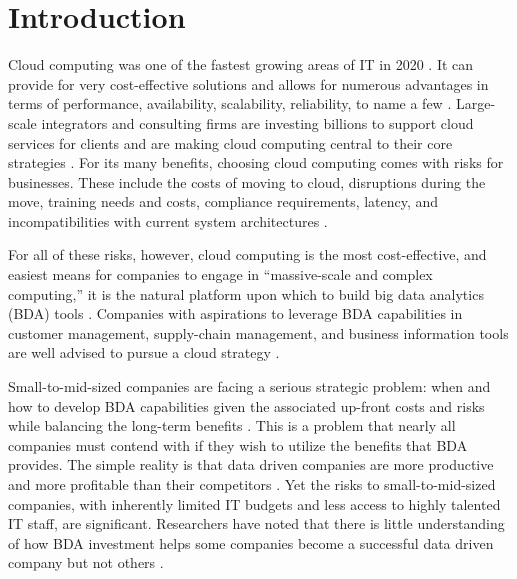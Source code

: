 \section{Introduction}

Cloud computing was one of the fastest growing areas of IT in 2020 \parencite{gartnerTrendsImpactingCloud2020}. It can provide for very cost-effective solutions and allows for numerous advantages in terms of performance, availability, scalability, reliability, to name a few \parencite{ibmBenefitsCloudComputing2020}.  Large-scale integrators and consulting firms are investing billions to support cloud services for clients and are making cloud computing central to their core strategies \parencite{accentureAccentureCloudFirst2020}. For its many benefits, choosing cloud computing comes with risks for businesses. These include the costs of moving to cloud, disruptions during the move, training needs and costs, compliance requirements, latency, and incompatibilities with current system architectures \parencite{cookCloudMigrationRisks2019}.

For all of these risks, however, cloud computing is the most cost-effective, and easiest means for companies to engage in ``massive-scale and complex computing,'' it is the natural platform upon which to build big data analytics (BDA) tools \parencite{hashemRiseBigData2015}. Companies with aspirations to leverage BDA capabilities in customer management, supply-chain management, and business information tools are well advised to pursue a cloud strategy \parencite{taliaCloudsScalableBig2013}.

Small-to-mid-sized companies are facing a serious strategic problem: when and how to develop BDA capabilities given the associated up-front costs and risks while balancing the long-term benefits \parencite{ajimokoConsiderationsAdoptionCloud2018}. This is a problem that nearly all companies must contend with if they wish to utilize the benefits that BDA provides. The simple reality is that data driven companies are more productive and more profitable than their competitors \parencite{alsghaierImportanceBigData2017}. Yet the risks to small-to-mid-sized companies, with inherently limited IT budgets and less access to highly talented IT staff, are significant. Researchers have noted that there is little understanding of how BDA investment helps some companies become a successful data driven company but not others \parencite{morenoBusinessIntelligenceAnalytics2020}.
